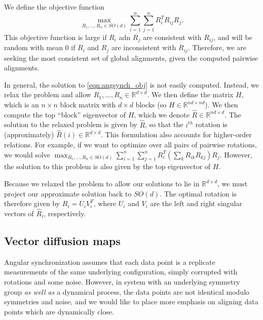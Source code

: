 \documentclass[10pt]{article}
\begin{document}
We define the objective function 
\begin{equation} \label{eqn:angsynch_obj}
\max_{R_1, \dots, R_n \in SO(d)} \sum_{i=1}^{n} \sum_{j=1}^{n} R_i^T R_{ij} R_j.
\end{equation}
%
This objective function is large if $R_i$ adn $R_j$ are consistent with $R_{ij}$, and will be random with mean 0 if $R_i$ and $R_j$ are inconsistent with $R_{ij}$.
%
Therefore, we are seeking the most consistent set of global alignments, given the computed pairwise alignments.

In general, the solution to \eqref{eqn:angsynch_obj} is not easily computed.
%
Instead, we relax the problem and allow $R_1, \dots, R_n \in \mathbb{R}^{d \times d}$.
%
We then define the matrix $H$, which is an $n \times n$ block matrix with $d \times d$ blocks (so $H \in \mathbb{R}^{nd \times nd}$).
%
We then compute the top ``block'' eigenvector of $H$, which we denote $\hat{R} \in \mathbb{R}^{nd \times d}$. 
%
The solution to the relaxed problem is given by $\hat{R}$, so that the $i^{th}$ rotation is (approximately) $\hat{R}(i) \in \mathbb{R}^{d \times d}$.
%
This formulation also accounts for higher-order relations.
%
For example, if we want to optimize over all pairs of pairwise rotations, we would solve $\max_{R_1, \dots, R_n \in SO(d)} \sum_{i=1}^{n} \sum_{j=1}^{n} R_i^T \left( \sum_k R_{ik} R_{kj} \right) R_j$. 
%
However, the solution to this problem is also given by the top eigenvector of $H$. 

Because we relaxed the problem to allow our solutions to lie in $\mathbb{R}^{d \times d}$, we must project our approximate solution back to $SO(d)$.
%
The optimal rotation is therefore given by $R_i = U_i V_i^T$, where $U_i$ and $V_i$ are the left and right singular vectors of $\hat{R}_i$, respectively. 

\subsection*{Vector diffusion maps} 

Angular synchronization assumes that each data point is a replicate measurements of the same underlying configuration, simply corrupted with rotations and some noise.
%
However, in system with an underlying symmetry group {\em as well as} a dynamical process, the data points are not identical modulo symmetries and noise, and we would like to place more emphasis on aligning data points which are dynamically close.
\end{document}
